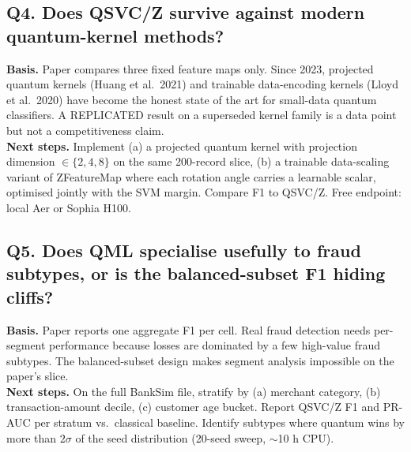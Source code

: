 \subsection*{Q4. Does QSVC/Z survive against modern quantum-kernel methods?}
\textbf{Basis.} Paper compares three fixed feature maps only. Since 2023, projected
quantum kernels (Huang et al.\ 2021) and trainable data-encoding kernels (Lloyd et al.\
2020) have become the honest state of the art for small-data quantum classifiers. A
REPLICATED result on a superseded kernel family is a data point but not a
competitiveness claim.\\
\textbf{Next steps.} Implement (a) a projected quantum kernel with projection dimension
$\in \{2,4,8\}$ on the same 200-record slice, (b) a trainable data-scaling variant of
ZFeatureMap where each rotation angle carries a learnable scalar, optimised jointly
with the SVM margin. Compare F1 to QSVC/Z. Free endpoint: local Aer or Sophia H100.

\subsection*{Q5. Does QML specialise usefully to fraud subtypes, or is the balanced-subset F1 hiding cliffs?}
\textbf{Basis.} Paper reports one aggregate F1 per cell. Real fraud detection needs
per-segment performance because losses are dominated by a few high-value fraud
subtypes. The balanced-subset design makes segment analysis impossible on the paper's
slice.\\
\textbf{Next steps.} On the full BankSim file, stratify by (a) merchant category, (b)
transaction-amount decile, (c) customer age bucket. Report QSVC/Z F1 and PR-AUC per
stratum vs.\ classical baseline. Identify subtypes where quantum wins by more than
$2\sigma$ of the seed distribution (20-seed sweep, $\sim$10 h CPU).

